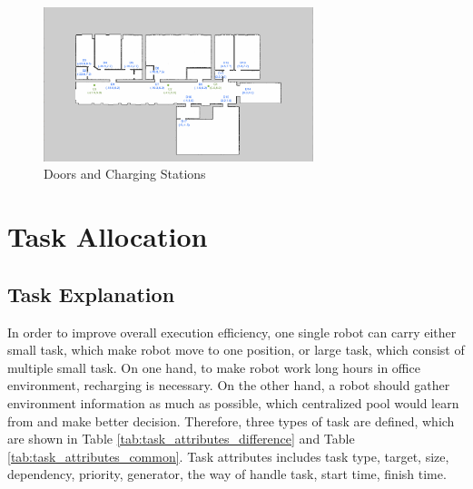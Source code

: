 \begin{figure}[htbp]
	\centering
	\includegraphics[width = 0.7\textwidth]{content/images/ch3/positions_door_station.png}
	\caption{Doors and Charging Stations}
	\label{fig:positions_door_station}
\end{figure}

\section{Task Allocation}

\subsection{Task Explanation}
\label{sec:task_explanation}
In order to improve overall execution efficiency, one single robot can carry either small task, which make robot move to one position, or large task, which consist of multiple small task.
On one hand, to make robot work long hours in office environment, recharging is necessary. On the other hand, a robot should gather environment information as much as possible, which centralized pool would learn from and make better decision. 
Therefore, three types of task are defined, which are shown in Table \ref{tab:task_attributes_difference} and Table \ref{tab:task_attributes_common}.  Task attributes includes task type, target, size, dependency, priority, generator, the way of handle task, start time, finish time.

\begin{table}[htb]
\centering
{}
\caption{Task arributes part 1}
\label{tab:task_attributes_difference}
\end{table}

